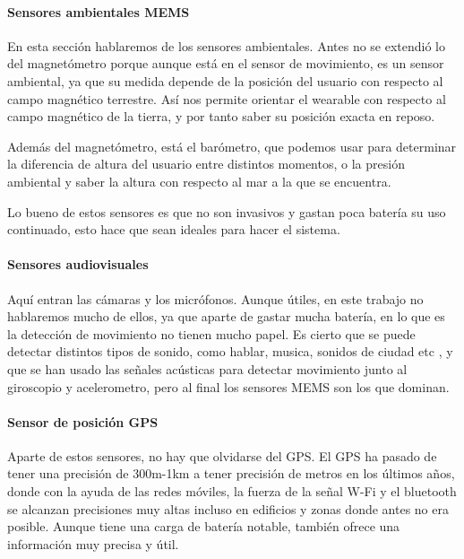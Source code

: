 \documentclass[12pt]{article}
\numberwithin{equation}{section}
\begin{document}
\paragraph{Sensores ambientales MEMS}

En esta sección hablaremos de los sensores ambientales. Antes no se extendió lo del magnetómetro porque aunque está en el sensor de movimiento, es un sensor ambiental, ya que su medida depende de la posición del usuario con respecto al campo magnético terrestre. Así nos permite orientar el wearable con respecto al campo magnético de la tierra, y por tanto saber su posición exacta en reposo.

Además del magnetómetro, está el barómetro, que podemos usar para determinar la diferencia de altura del usuario entre distintos momentos, o la presión ambiental y saber la altura con respecto al mar a la que se encuentra.

Lo bueno de estos sensores es que no son invasivos y gastan poca batería su uso continuado, esto  hace que sean ideales para hacer el sistema.
\paragraph{Sensores audiovisuales}

Aquí entran las cámaras y los micrófonos. Aunque útiles, en este trabajo no hablaremos mucho de ellos, ya que aparte de gastar mucha batería, en lo que es la detección de movimiento no tienen mucho papel. Es cierto que se puede detectar distintos tipos de sonido, como hablar, musica, sonidos de ciudad etc \cite{Lu:2009:SSS:1555816.1555834}, y que se han usado las señales acústicas para detectar movimiento junto al giroscopio y acelerometro\cite{doi:10.1155/2014/503291}, pero al final los sensores MEMS son los que dominan.

\paragraph{Sensor de posición GPS}

Aparte de estos sensores, no hay que olvidarse del GPS. El GPS ha pasado de tener una precisión de 300m-1km\cite{vonWatzdorf:2010:APD:1899662.1899664} a tener precisión de metros en los últimos años\cite{s213}, donde con la ayuda de las redes móviles, la fuerza de la señal W-Fi y el bluetooth se alcanzan precisiones muy altas incluso en edificios y zonas donde antes no era posible. Aunque tiene una carga de batería notable, también ofrece una información muy precisa y útil.
\end{document}
